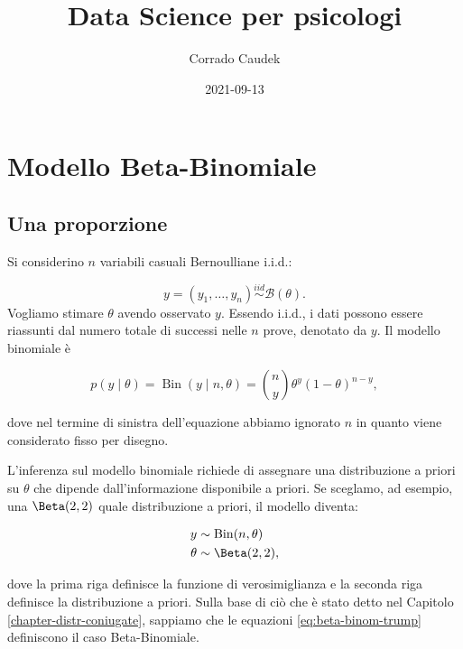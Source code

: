 \documentclass[
]{memoir}
\title{Data Science per psicologi}
\author{Corrado Caudek}
\date{2021-09-13}
\DeclareMathOperator{\Bin}{Bin} %
\begin{document}
\maketitle

{
\hypersetup{linkcolor=}
\setcounter{tocdepth}{1}
\tableofcontents
}
\newpage

\vspace*{5cm}

\thispagestyle{empty}

\hypertarget{mod-binom}{%
\chapter{Modello Beta-Binomiale}\label{mod-binom}}

\hypertarget{una-proporzione}{%
\section{Una proporzione}\label{una-proporzione}}

Si considerino \(n\) variabili casuali Bernoulliane i.i.d.:

\[
y = (y_1, \dots, y_n) \stackrel{iid}{\sim} \mathcal{B}(\theta).
\]
\noindent
Vogliamo stimare \(\theta\) avendo osservato \(y\). Essendo i.i.d., i dati possono essere riassunti dal numero totale di successi nelle \(n\) prove, denotato da \(y\). Il modello binomiale è

\begin{equation}
p(y \mid \theta) = \Bin(y \mid n, \theta) = \binom{n}{y}\theta^y (1 -\theta)^{n-y},
\end{equation}

\noindent
dove nel termine di sinistra dell'equazione abbiamo ignorato \(n\) in quanto viene considerato fisso per disegno.

L'inferenza sul modello binomiale richiede di assegnare una distribuzione a priori su \(\theta\) che dipende dall'informazione disponibile a priori. Se sceglamo, ad esempio, una \(\Beta(2, 2)\) quale distribuzione a priori, il modello diventa:

\begin{align}
y &\sim \Bin(n, \theta) \notag\\
\theta &\sim \Beta(2, 2),
\label{eq:beta-binom-trump}
\end{align}

\noindent
dove la prima riga definisce la funzione di verosimiglianza e la seconda riga definisce la distribuzione a priori. Sulla base di ciò che è stato detto nel Capitolo \ref{chapter-distr-coniugate}, sappiamo che le equazioni \eqref{eq:beta-binom-trump} definiscono il caso Beta-Binomiale.
\end{document}
